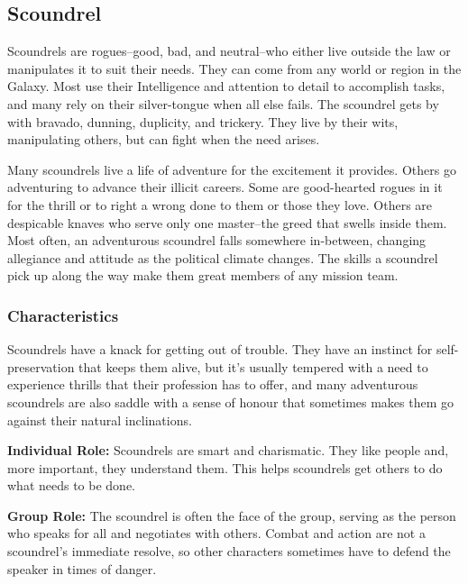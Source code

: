 \documentclass[a4paper,10pt,final,twocolumn,oneside]{book}
\newcommand{\itemLine}[2]{\textbf{#1:}{ #2}\par}
\begin{document}
\clearpage


%
%
%
%
%
%
%
%
%
%
%
%
%
%
%
%
%
%
%


\subsection{Scoundrel} %
\label{sub:scoundrel}

Scoundrels are rogues--good, bad, and neutral--who either live outside the law or manipulates it to suit their needs. They can come from any world or region in the Galaxy. Most use their Intelligence and attention to detail to accomplish tasks, and many rely on their silver-tongue when all else fails. The scoundrel gets by with bravado, dunning, duplicity, and trickery. They live by their wits, manipulating others, but can fight when the need arises.

Many scoundrels live a life of adventure for the excitement it provides. Others go adventuring to advance their illicit careers. Some are good-hearted rogues in it for the thrill or to right a wrong done to them or those they love. Others are despicable knaves who serve only one master--the greed that swells inside them. Most often, an adventurous scoundrel falls somewhere in-between, changing allegiance and attitude as the political climate changes. The skills a scoundrel pick up along the way make them great members of any mission team.

\subsubsection*{Characteristics}
\label{subsub:scoundrelCharacteristics}

Scoundrels have a knack for getting out of trouble. They have an instinct for self-preservation that keeps them alive, but it's usually tempered with a need to experience thrills that their profession has to offer, and many adventurous scoundrels are also saddle with a sense of honour that sometimes makes them go against their natural inclinations.

\itemLine{Individual Role}{Scoundrels are smart and charismatic. They like people and, more important, they understand them. This helps scoundrels get others to do what needs
to be done.}

\itemLine{Group Role}{The scoundrel is often the face of the group, serving as the person who speaks for all and negotiates with others. Combat and action are not a scoundrel's immediate resolve, so other characters sometimes have to defend the speaker in times of danger.}
\end{document}
